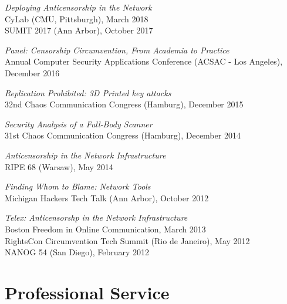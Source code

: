 \documentclass[margin,11pt]{res} %
\begin{document}
\emph{Deploying Anticensorship in the Network} \\
    CyLab (CMU, Pittsburgh), March 2018 \\
    SUMIT 2017 (Ann Arbor), October 2017

\emph{Panel: Censorship Circumvention, From Academia to Practice} \\
    Annual Computer Security Applications Conference (ACSAC - Los Angeles), December 2016

\emph{Replication Prohibited: 3D Printed key attacks} \\
    32nd Chaos Communication Congress (Hamburg), December 2015

\emph{Security Analysis of a Full-Body Scanner} \\
    31st Chaos Communication Congress (Hamburg), December 2014

\emph{Anticensorship in the Network Infrastructure} \\
    RIPE 68 (Warsaw), May 2014


\emph{Finding Whom to Blame: Network Tools} \\
    Michigan Hackers Tech Talk (Ann Arbor), October 2012

\emph{Telex: Anticensorshp in the Network Infrastructure} \\
    Boston Freedom in Online Communication, March 2013\\
    RightsCon Circumvention Tech Summit (Rio de Janeiro), May 2012 \\
    NANOG 54 (San Diego), February 2012 %




\vspace{6pt}
\section{\large Professional Service}
\end{document}

